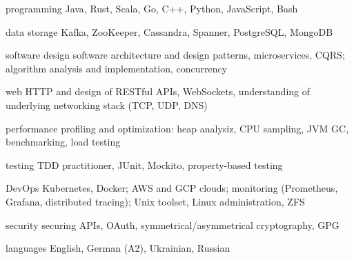 

\begin{cvskills}

  \cvskill
    {programming} %
    {Java, Rust, Scala, Go, C++, Python, JavaScript, Bash} %

  \cvskill
    {data storage} %
    {Kafka, ZooKeeper, Cassandra, Spanner, PostgreSQL, MongoDB} %

  \cvskill
    {software design} %
    {software architecture and design patterns, microservices, CQRS; algorithm analysis and implementation, concurrency} %

  \cvskill
    {web} %
    {HTTP and design of RESTful APIs, WebSockets, understanding of underlying networking stack (TCP, UDP, DNS)} %

  \cvskill
    {performance} %
    {profiling and optimization: heap analysiz, CPU sampling, JVM GC, benchmarking, load testing} %

  \cvskill
    {testing} %
    {TDD practitioner, JUnit, Mockito, property-based testing} %

  \cvskill
    {DevOps} %
    {Kubernetes, Docker; AWS and GCP clouds; monitoring (Prometheus, Grafana, distributed tracing); Unix toolset, Linux administration, ZFS} %

  \cvskill
    {security} %
    {securing APIs, OAuth, symmetrical/asymmetrical cryptography, GPG} %

  \cvskill
    {languages} %
    {English, German (A2), Ukrainian, Russian} %

\end{cvskills}
